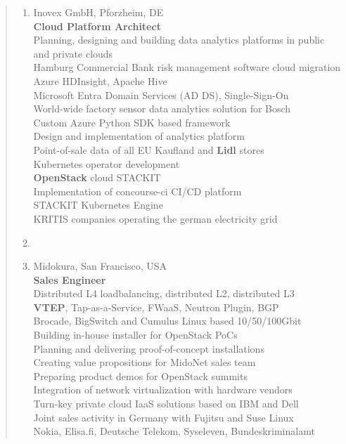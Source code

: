 \documentclass[a4paper]{report}
\begin{document}
\begin{quote}
\begin{enumerate}
\item[2017 - 2023]
                    Inovex GmbH, Pforzheim, DE\\
                    \textbf{Cloud Platform Architect}\\
                    Planning, designing and building data analytics platforms in public and private clouds\\
                    Hamburg Commercial Bank risk management software cloud migration\\
                    Azure HDInsight, Apache Hive\\
                    Microsoft Entra Domain Services (AD DS), Single-Sign-On\\
                    World-wide factory sensor data analytics solution for Bosch\\
                    Custom Azure Python SDK based framework\\
                    Design and implementation of analytics platform\\
                    Point-of-sale data of all EU Kaufland and \textbf{Lidl} stores\\
                    Kubernetes operator development\\
                    \textbf{OpenStack} cloud STACKIT\\
                    Implementation of concourse-ci CI/CD platform\\
                    STACKIT Kubernetes Engine\\
                    KRITIS companies operating the german electricity grid
\item[ ]

\item[2014 - 2016]
                    Midokura, San Francisco, USA\\
                    \textbf{Sales Engineer}\\
                    Distributed L4 loadbalancing, distributed L2, distributed L3\\
                    \textbf{VTEP}, Tap-as-a-Service, FWaaS, Neutron Plugin, BGP\\
                    Brocade, BigSwitch and Cumulus Linux based 10/50/100Gbit\\
                    Building in-house installer for OpenStack PoCs\\
                    Planning and delivering proof-of-concept installations\\
                    Creating value propositions for MidoNet sales team\\
                    Preparing product demos for OpenStack summits\\
                    Integration of network virtualization with hardware vendors\\
                    Turn-key private cloud IaaS solutions based on IBM and Dell\\
                    Joint sales activity in Germany with Fujitsu and Suse Linux\\
                    Nokia, Elisa.fi, Deutsche Telekom, Syseleven, Bundeskriminalamt


\end{enumerate}
\end{quote}
\end{document}
